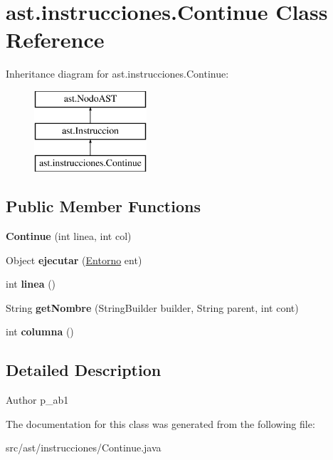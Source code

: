 \hypertarget{classast_1_1instrucciones_1_1_continue}{}\section{ast.\+instrucciones.\+Continue Class Reference}
\label{classast_1_1instrucciones_1_1_continue}
Inheritance diagram for ast.\+instrucciones.\+Continue\+:\begin{figure}[H]
\begin{center}
\leavevmode
\includegraphics[height=3.000000cm]{classast_1_1instrucciones_1_1_continue}
\end{center}
\end{figure}
\subsection*{Public Member Functions}
\begin{DoxyCompactItemize}
\item 
\mbox{\label{classast_1_1instrucciones_1_1_continue_ac7ef7c94a32e7857df71347123812d72}} 
{\bfseries Continue} (int linea, int col)
\item 
\mbox{\label{classast_1_1instrucciones_1_1_continue_a27917e95b57605360e538ee6301a13ee}} 
Object {\bfseries ejecutar} (\mbox{\hyperlink{classentorno_1_1_entorno}{Entorno}} ent)
\item 
\mbox{\label{classast_1_1instrucciones_1_1_continue_a13058684f74e61d1e8093907645e3726}} 
int {\bfseries linea} ()
\item 
\mbox{\label{classast_1_1instrucciones_1_1_continue_a2f41948b20f2546f18e176ad4a108be6}} 
String {\bfseries get\+Nombre} (String\+Builder builder, String parent, int cont)
\item 
\mbox{\label{classast_1_1instrucciones_1_1_continue_ad7ed0a53345e43687780fb66ac028976}} 
int {\bfseries columna} ()
\end{DoxyCompactItemize}


\subsection{Detailed Description}
\begin{DoxyAuthor}{Author}
p\+\_\+ab1 
\end{DoxyAuthor}


The documentation for this class was generated from the following file\+:\begin{DoxyCompactItemize}
\item 
src/ast/instrucciones/Continue.\+java\end{DoxyCompactItemize}
